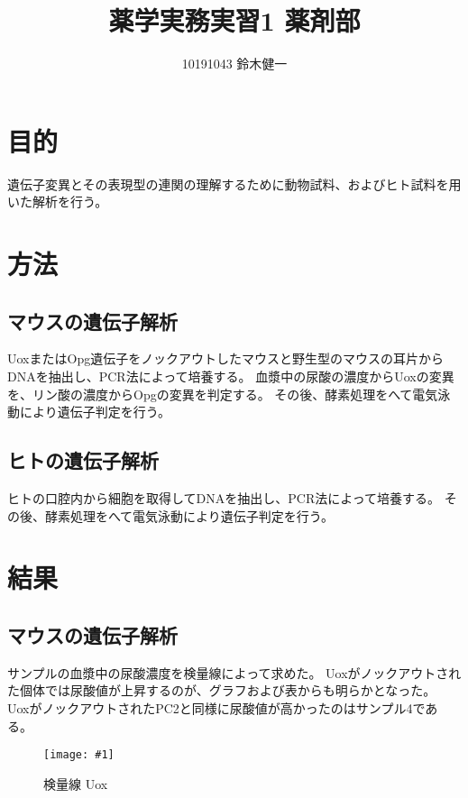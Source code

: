 \documentclass[a4paper,papersize,dvipdfmx]{jsarticle}
\newcommand{\piccap}[3]{\begin{figure}[H] \centering \texttt{[image: \#1]} \caption{#3} \label{fig {#1}} \end{figure}} %
\begin{document}
\title{薬学実務実習1 薬剤部}
\author{10191043 鈴木健一}
\date{}
\maketitle



\section*{目的}
遺伝子変異とその表現型の連関の理解するために動物試料、およびヒト試料を用いた解析を行う。

\section*{方法}
\subsection*{マウスの遺伝子解析}
UoxまたはOpg遺伝子をノックアウトしたマウスと野生型のマウスの耳片からDNAを抽出し、PCR法によって培養する。
血漿中の尿酸の濃度からUoxの変異を、リン酸の濃度からOpgの変異を判定する。
その後、酵素処理をへて電気泳動により遺伝子判定を行う。


\subsection*{ヒトの遺伝子解析}
ヒトの口腔内から細胞を取得してDNAを抽出し、PCR法によって培養する。
その後、酵素処理をへて電気泳動により遺伝子判定を行う。

\section*{結果}

\subsection*{マウスの遺伝子解析}

サンプルの血漿中の尿酸濃度を検量線によって求めた。
Uoxがノックアウトされた個体では尿酸値が上昇するのが、グラフおよび表からも明らかとなった。
UoxがノックアウトされたPC2と同様に尿酸値が高かったのはサンプル4である。

\piccap{images/graph-uox.png}{10}{検量線 Uox}
\end{document}
